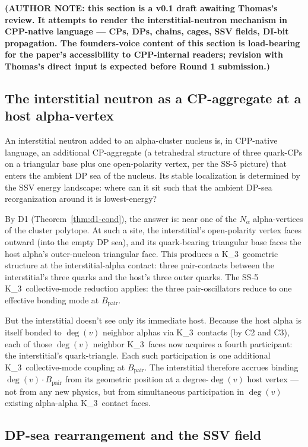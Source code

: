 \documentclass[11pt,letterpaper]{article}
\theoremstyle{definition}
\newcommand{\Bpair}{B_{\text{pair}}}
\newcommand{\Nalpha}{N_\alpha}
\newcommand{\Kthree}{K_3}
\newcommand{\degv}{\deg(v)}
\begin{document}
\textbf{(AUTHOR NOTE: this section is a v0.1 draft awaiting Thomas's review. It attempts to render the interstitial-neutron mechanism in CPP-native language --- CPs, DPs, chains, cages, SSV fields, DI-bit propagation. The founders-voice content of this section is load-bearing for the paper's accessibility to CPP-internal readers; revision with Thomas's direct input is expected before Round 1 submission.)}

\subsection{The interstitial neutron as a CP-aggregate at a host alpha-vertex}
\label{sec:interstitial-cp}

An interstitial neutron added to an alpha-cluster nucleus is, in CPP-native language, an additional CP-aggregate (a tetrahedral structure of three quark-CPs on a triangular base plus one open-polarity vertex, per the SS-5 picture) that enters the ambient DP sea of the nucleus. Its stable localization is determined by the SSV energy landscape: where can it sit such that the ambient DP-sea reorganization around it is lowest-energy?

By D1 (Theorem~\ref{thm:d1-cond}), the answer is: near one of the $\Nalpha$ alpha-vertices of the cluster polytope. At such a site, the interstitial's open-polarity vertex faces outward (into the empty DP sea), and its quark-bearing triangular base faces the host alpha's outer-nucleon triangular face. This produces a \Kthree\ geometric structure at the interstitial-alpha contact: three pair-contacts between the interstitial's three quarks and the host's three outer quarks. The SS-5 \Kthree\ collective-mode reduction applies: the three pair-oscillators reduce to one effective bonding mode at $\Bpair$.

But the interstitial doesn't see only its immediate host. Because the host alpha is itself bonded to $\degv$ neighbor alphas via \Kthree\ contacts (by C2 and C3), each of those $\degv$ neighbor \Kthree\ faces now acquires a fourth participant: the interstitial's quark-triangle. Each such participation is one additional \Kthree\ collective-mode coupling at $\Bpair$. The interstitial therefore accrues binding $\degv \cdot \Bpair$ from its geometric position at a degree-$\degv$ host vertex --- not from any new physics, but from simultaneous participation in $\degv$ existing alpha-alpha \Kthree\ contact faces.

\subsection{DP-sea rearrangement and the SSV field}
\label{sec:dp-sea}
\end{document}
